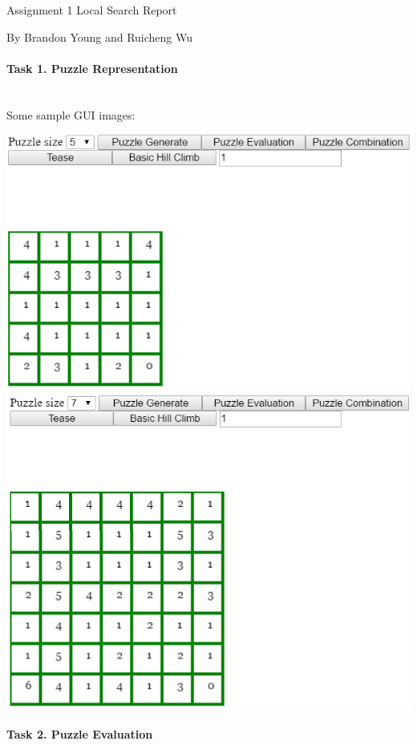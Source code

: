 \documentclass[12pt, letterpaper]{article}
\begin{document}
Assignment 1 Local Search Report

By Brandon Young and Ruicheng Wu

\bigskip

\paragraph{Task 1. Puzzle Representation} \mbox{}\\

\qquad Some sample GUI images:

\includegraphics[width=\linewidth]{"Task 1/Sample GUI 1"}
\includegraphics[width=\linewidth]{"Task 1/Sample GUI 2"}

\pagebreak

\paragraph{Task 2. Puzzle Evaluation} \mbox{}\\
\end{document}
